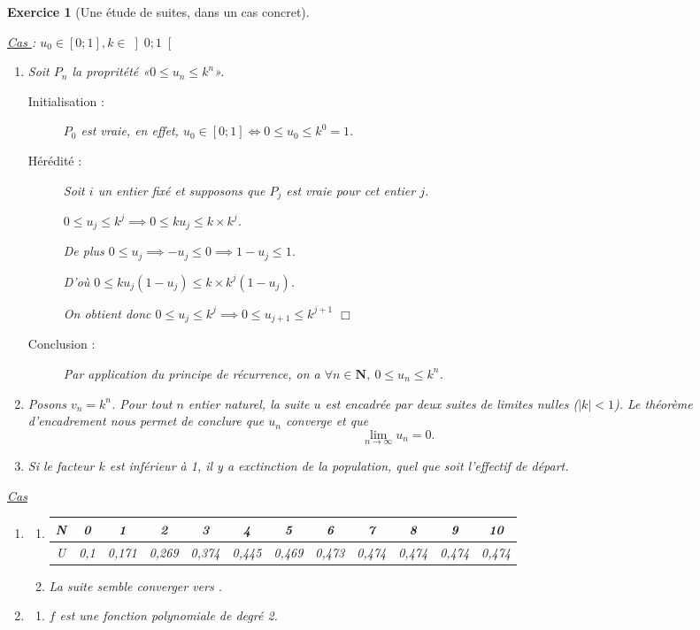 \documentclass[12pt,a4paper]{article}
\newcommand{\np}{\numprint}
\theoremstyle{break}
\theoremstyle{nobreak}
\newtheorem{exercice}{Exercice}
\theoremstyle{nonumberplain}
\newcommand{\N}{\mathbf{N}}
\newcommand{\qed}{\hfill$\Box$}
\newcommand{\abs}[1]{\left\lvert #1\right\rvert}
\begin{document}
\begin{exercice}[Une étude de suites, dans un cas concret]~

  \underline{Cas } : $u_0 \in \left[0;1\right], k\in
  \left]0;1\right[$
  \begin{enumerate}
    \item Soit $P_n$ la propritété «$0\leqslant u_n \leqslant k^n$».
      \begin{description}
        \item[Initialisation :] $P_0$ est vraie, en effet, $u_0 \in
          [0;1] \iff 0\leqslant u_0 \leqslant k^0 = 1$.
        \item[Hérédité :] Soit $i$ un entier fixé et supposons que $P_j$
          est vraie pour cet entier $j$.

          $0\leqslant u_j \leqslant k^j \implies 0\leqslant ku_j
          \leqslant k\times k^j$.

          De plus $0\leqslant u_j \implies -u_j \leqslant 0 \implies 1 -
          u_j \leqslant 1$.

          D'où $0\leqslant ku_j(1 - u_j) \leqslant k\times k^j (1 -
          u_j)$.

          On obtient donc $0\leqslant u_j \leqslant k^j \implies
          0\leqslant u_{j+1} \leqslant k^{j+1}$ \qed
        \item [Conclusion :] Par application du principe de récurrence,
          on a $\forall n\in\N,\ 0\leqslant u_n \leqslant k^n$.
      \end{description}
    \item Posons $v_n = k^n$. Pour tout $n$ entier naturel, la suite $u$
      est encadrée par deux suites de limites nulles ($\abs{k} < 1$). Le
      théorème d'encadrement nous permet de conclure que $u_n$ converge
      et que \[\boxed{\lim_{n\to\infty}u_n = 0.}\]
    \item Si le facteur $k$ est inférieur à 1, il y a exctinction de la
      population, quel que soit l'effectif de départ.
  \end{enumerate}
  \underline{Cas }
  \begin{enumerate}
    \item
      \begin{enumerate}
        \item
          \footnotesize
          \begin{tabular}{|*{12}{c|}} \hline
            N & 0 & 1 & 2 & 3 & 4 & 5 & 6 & 7 & 8 & 9 & 10 \\ \hline
            U & 0,1 & 0,171 & 0,269 & 0,374 & 0,445 & 0,469 & 0,473 &
            0,474 & 0,474 & 0,474 & 0,474 \\ \hline
          \end{tabular}
          \normalsize
        \item La suite semble converger vers \np{0.474}.
      \end{enumerate}
    \item
      \begin{enumerate}
        \item $f$ est une fonction polynomiale de degré 2.


\end{enumerate}
\end{enumerate}
\end{exercice}
\end{document}
